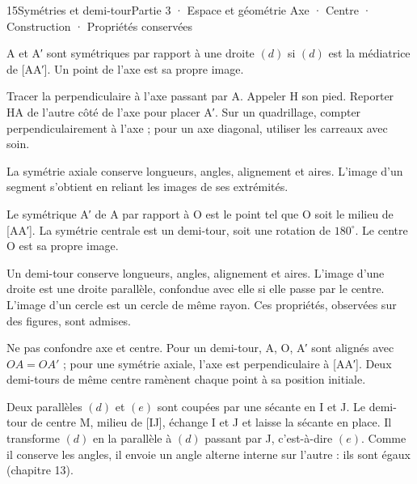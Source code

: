 \begin{ouverture}[geometrie]{15}{Symétries et demi-tour}{Partie 3 · Espace et géométrie}
{Axe · Centre · Construction · Propriétés conservées}
\end{ouverture}
\pagestyle{otMain}\essentiel\fontsize{11}{15}\selectfont
{}\label{cours-15-1}
\begin{definition}A et A′ sont symétriques par rapport à une droite $(d)$ si $(d)$ est la médiatrice de [AA′]. Un point de l’axe est sa propre image.\end{definition}
\label{fig-cours-15-1-cours-axiale}

\begin{savoirfaire}Tracer la perpendiculaire à l’axe passant par A. Appeler H son pied. Reporter HA de l’autre côté de l’axe pour placer A′. Sur un quadrillage, compter perpendiculairement à l’axe ; pour un axe diagonal, utiliser les carreaux avec soin.\end{savoirfaire}
\begin{propriete}La symétrie axiale conserve longueurs, angles, alignement et aires. L’image d’un segment s’obtient en reliant les images de ses extrémités.\end{propriete}
\clearpage
{}\label{cours-15-2}
\begin{definition}Le symétrique A′ de A par rapport à O est le point tel que O soit le milieu de [AA′]. La symétrie centrale est un demi-tour, soit une rotation de $180^\circ$. Le centre O est sa propre image.\end{definition}
\label{fig-cours-15-2-cours-centrale}

\begin{propriete}Un demi-tour conserve longueurs, angles, alignement et aires. L’image d’une droite est une droite parallèle, confondue avec elle si elle passe par le centre. L’image d’un cercle est un cercle de même rayon. Ces propriétés, observées sur des figures, sont admises.\end{propriete}
\begin{attention}Ne pas confondre axe et centre. Pour un demi-tour, A, O, A′ sont alignés avec $OA=OA′$ ; pour une symétrie axiale, l’axe est perpendiculaire à [AA′]. Deux demi-tours de même centre ramènent chaque point à sa position initiale.\end{attention}
\begin{savoirfaire}Deux parallèles $(d)$ et $(e)$ sont coupées par une sécante en I et J. Le demi-tour de centre M, milieu de [IJ], échange I et J et laisse la sécante en place. Il transforme $(d)$ en la parallèle à $(d)$ passant par J, c’est-à-dire $(e)$. Comme il conserve les angles, il envoie un angle alterne interne sur l’autre : ils sont égaux (chapitre 13).\end{savoirfaire}

